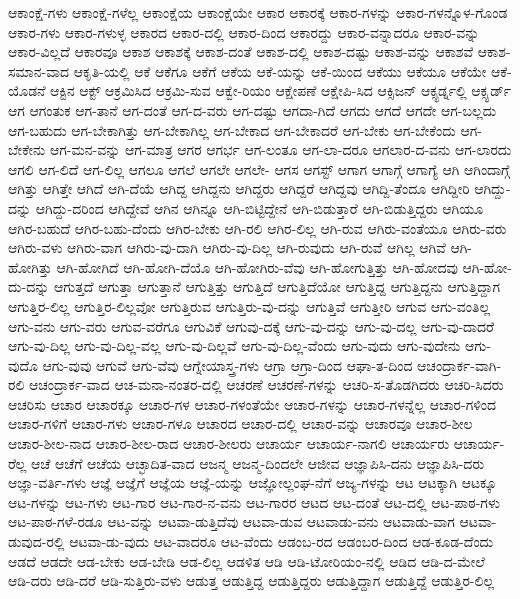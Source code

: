 {ಆಕಾಂಕ್ಷೆ-ಗಳು
ಆಕಾಂಕ್ಷೆ-ಗಳೆಲ್ಲ
ಆಕಾಂಕ್ಷೆಯ
ಆಕಾಂಕ್ಷೆಯೇ
ಆಕಾರ
ಆಕಾರಕ್ಕೆ
ಆಕಾರ-ಗಳನ್ನು
ಆಕಾರ-ಗಳನ್ನೊಳ-ಗೊಂಡ
ಆಕಾರ-ಗಳು
ಆಕಾರ-ಗಳುಳ್ಳ
ಆಕಾರದ
ಆಕಾರ-ದಲ್ಲಿ
ಆಕಾರ-ದಿಂದ
ಆಕಾರದ್ದು
ಆಕಾರ-ವನ್ನಾದರೂ
ಆಕಾರ-ವನ್ನು
ಆಕಾರ-ವಿಲ್ಲದೆ
ಆಕಾರವೂ
ಆಕಾಶ
ಆಕಾಶಕ್ಕೆ
ಆಕಾಶ-ದಂತೆ
ಆಕಾಶ-ದಲ್ಲಿ
ಆಕಾಶ-ದಷ್ಟು
ಆಕಾಶ-ವನ್ನು
ಆಕಾಶವೆ
ಆಕಾಶ-ಸಮಾನ-ವಾದ
ಆಕೃತಿ-ಯಲ್ಲಿ
ಆಕೆ
ಆಕೆಗೂ
ಆಕೆಗೆ
ಆಕೆಯ
ಆಕೆ-ಯನ್ನು
ಆಕೆ-ಯಿಂದ
ಆಕೆಯು
ಆಕೆಯೂ
ಆಕೆಯೇ
ಆಕೆ-ಯೊಡನೆ
ಆಕ್ಟಿನ
ಆಕ್ಟ್
ಆಕ್ರಮಿಸಿದ
ಆಕ್ರಮಿ-ಸುವ
ಆಕ್ವೇ-ರಿಯಂ
ಆಕ್ಷೇಪಣೆ
ಆಕ್ಷೇಪಿ-ಸಿದ
ಆಕ್ಸಿಜನ್
ಆಕ್ಸ್ಫರ್ಡ್ನಲ್ಲಿ
ಆಕ್ಸ್ಫರ್ಡ್
ಆಗ
ಆಗಂತುಕ
ಆಗ-ತಾನೆ
ಆಗ-ದಂತೆ
ಆಗ-ದ-ವರು
ಆಗ-ದಷ್ಟು
ಆಗದಾ-ಗಿದೆ
ಆಗದು
ಆಗದೆ
ಆಗದೇ
ಆಗ-ಬಲ್ಲದು
ಆಗ-ಬಹುದು
ಆಗ-ಬೇಕಾಗಿತ್ತು
ಆಗ-ಬೇಕಾಗಿಲ್ಲ
ಆಗ-ಬೇಕಾದ
ಆಗ-ಬೇಕಾದರೆ
ಆಗ-ಬೇಕು
ಆಗ-ಬೇಕೆಂದು
ಆಗ-ಬೇಕೇನು
ಆಗ-ಮನ-ವನ್ನು
ಆಗ-ಮಾತ್ರ
ಆಗರ
ಆಗರ್ಭ
ಆಗ-ಲಂತೂ
ಆಗ-ಲಾ-ದರೂ
ಆಗಲಾರ-ದ-ವನು
ಆಗ-ಲಾರದು
ಆಗಲಿ
ಆಗ-ಲಿದೆ
ಆಗ-ಲಿಲ್ಲ
ಆಗಲೂ
ಆಗಲೆ
ಆಗಲೇ
ಆಗಲೇ-
ಆಗಸ
ಆಗಸ್ಟ್
ಆಗಾಗ
ಆಗಾಗ್ಗೆ
ಆಗಾಗ್ಯೆ
ಆಗಿ
ಆಗಿಂದಾಗ್ಗೆ
ಆಗಿತ್ತು
ಆಗಿತ್ತೇ
ಆಗಿದೆ
ಆಗಿ-ದೆಯೆ
ಆಗಿದ್ದ
ಆಗಿದ್ದನು
ಆಗಿದ್ದರು
ಆಗಿದ್ದರೆ
ಆಗಿದ್ದವು
ಆಗಿದ್ದಿ-ತೆಂದೂ
ಆಗಿದ್ದೀರಿ
ಆಗಿದ್ದು-ದನ್ನು
ಆಗಿದ್ದು-ದರಿಂದ
ಆಗಿದ್ದೇವೆ
ಆಗಿನ
ಆಗಿನ್ನೂ
ಆಗಿ-ಬಿಟ್ಟಿದ್ದೇನೆ
ಆಗಿ-ಬಿಡುತ್ತಾರೆ
ಆಗಿ-ಬಿಡುತ್ತಿದ್ದರು
ಆಗಿಯೂ
ಆಗಿರ-ಬಹುದೆ
ಆಗಿರ-ಬಹು-ದೆಂದು
ಆಗಿರ-ಬೇಕು
ಆಗಿ-ರಲಿ
ಆಗಿರ-ಲಿಲ್ಲ
ಆಗಿ-ರುವ
ಆಗಿರು-ವಂತೆಯೂ
ಆಗಿರು-ವರು
ಆಗಿರು-ವಳು
ಆಗಿರು-ವಾಗ
ಆಗಿರು-ವು-ದಾಗಿ
ಆಗಿರು-ವು-ದಿಲ್ಲ
ಆಗಿ-ರುವುದು
ಆಗಿ-ರುವೆ
ಆಗಿಲ್ಲ
ಆಗಿವೆ
ಆಗಿ-ಹೋಗಿತ್ತು
ಆಗಿ-ಹೋಗಿದೆ
ಆಗಿ-ಹೋಗಿ-ದೆಯೊ
ಆಗಿ-ಹೋಗಿರು-ವೆವು
ಆಗಿ-ಹೋಗುತ್ತಿತ್ತು
ಆಗಿ-ಹೋದವು
ಆಗಿ-ಹೋ-ದು-ದನ್ನು
ಆಗುತ್ತದೆ
ಆಗುತ್ತಾ
ಆಗುತ್ತಾನೆ
ಆಗುತ್ತಿತ್ತು
ಆಗುತ್ತಿದೆ
ಆಗುತ್ತಿದೆಯೋ
ಆಗುತ್ತಿದ್ದ
ಆಗುತ್ತಿದ್ದನು
ಆಗುತ್ತಿದ್ದಾಗ
ಆಗುತ್ತಿರ-ಲಿಲ್ಲ
ಆಗುತ್ತಿರ-ಲಿಲ್ಲವೋ
ಆಗುತ್ತಿರುವ
ಆಗುತ್ತಿರು-ವು-ದನ್ನು
ಆಗುತ್ತಿವೆ
ಆಗುತ್ತೀರಿ
ಆಗುವ
ಆಗು-ವಂತಿಲ್ಲ
ಆಗು-ವನು
ಆಗು-ವರು
ಆಗುವ-ವರೆಗೂ
ಆಗುವಿಕೆ
ಆಗುವು-ದಕ್ಕೆ
ಆಗು-ವು-ದನ್ನು
ಆಗು-ವು-ದಲ್ಲ
ಆಗು-ವು-ದಾದರೆ
ಆಗು-ವು-ದಿಲ್ಲ
ಆಗು-ವು-ದಿಲ್ಲ-ವಲ್ಲ
ಆಗು-ವು-ದಿಲ್ಲವೆ
ಆಗು-ವು-ದಿಲ್ಲ-ವೆಂದು
ಆಗು-ವುದು
ಆಗು-ವುದೇನು
ಆಗು-ವುದೊ
ಆಗು-ವುವು
ಆಗುವೆ
ಆಗು-ವೆವು
ಆಗ್ನೇಯಾಸ್ತ್ರ-ಗಳು
ಆಗ್ರಾ
ಆಗ್ರಾ-ದಿಂದ
ಆಘಾ-ತ-ದಿಂದ
ಆಚಂದ್ರಾರ್ಕ-ವಾಗಿ-ರಲಿ
ಆಚಂದ್ರಾರ್ಕ-ವಾದ
ಆಚ-ಮನಾ-ನಂತರ-ದಲ್ಲಿ
ಆಚರಣೆ
ಆಚರಣೆ-ಗಳನ್ನು
ಆಚರಿ-ಸ-ತೊಡಗಿದರು
ಆಚರಿ-ಸಿದರು
ಆಚರಿಸು
ಆಚಾರ
ಆಚಾರಕ್ಕೂ
ಆಚಾರ-ಗಳ
ಆಚಾರ-ಗಳಂತೆಯೇ
ಆಚಾರ-ಗಳನ್ನು
ಆಚಾರ-ಗಳನ್ನೆಲ್ಲ
ಆಚಾರ-ಗಳಿಂದ
ಆಚಾರ-ಗಳಿಗೆ
ಆಚಾರ-ಗಳು
ಆಚಾರ-ಗಳೂ
ಆಚಾರದ
ಆಚಾರ-ದಲ್ಲಿ
ಆಚಾರ-ವನ್ನು
ಆಚಾರವೂ
ಆಚಾರ-ಶೀಲ
ಆಚಾರ-ಶೀಲ-ನಾದ
ಆಚಾರ-ಶೀಲ-ರಾದ
ಆಚಾರ-ಶೀಲರು
ಆಚಾರ್ಯ
ಆಚಾರ್ಯ-ನಾಗಲಿ
ಆಚಾರ್ಯರು
ಆಚಾರ್ಯ-ರೆಲ್ಲ
ಆಚೆ
ಆಚೆಗೆ
ಆಚೆಯ
ಆಚ್ಛಾದಿತ-ವಾದ
ಆಜನ್ಮ
ಆಜನ್ಮ-ದಿಂದಲೇ
ಆಜೀವ
ಆಜ್ಞಾಪಿಸಿ-ದನು
ಆಜ್ಞಾಪಿಸಿ-ದರು
ಆಜ್ಞಾ-ವರ್ತಿ-ಗಳು
ಆಜ್ಞೆ
ಆಜ್ಞೆಗೆ
ಆಜ್ಞೆಯ
ಆಜ್ಞೆ-ಯನ್ನು
ಆಜ್ಞೋಲ್ಲಂಘ-ನೆಗೆ
ಆಜ್ಯ-ಗಳನ್ನು
ಆಟ
ಆಟಕ್ಕಾಗಿ
ಆಟಕ್ಕೂ
ಆಟ-ಗಳನ್ನು
ಆಟ-ಗಳು
ಆಟ-ಗಾರ
ಆಟ-ಗಾರ-ನ-ವನು
ಆಟ-ಗಾರರ
ಆಟದ
ಆಟ-ದಂತೆ
ಆಟ-ದಲ್ಲಿ
ಆಟ-ಪಾಠ-ಗಳು
ಆಟ-ಪಾಠ-ಗಳೆ-ರಡೂ
ಆಟ-ವನ್ನು
ಆಟವಾ-ಡುತ್ತಿದೆವು
ಆಟವಾ-ಡುವ
ಆಟವಾಡು-ವನು
ಆಟವಾಡು-ವಾಗ
ಆಟವಾ-ಡುವುದ-ರಲ್ಲಿ
ಆಟವಾ-ಡು-ವುದು
ಆಟ-ವಾದರೂ
ಆಟ-ವೆಂದು
ಆಡಂಬ-ರದ
ಆಡಂಬರ-ದಿಂದ
ಆಡ-ಕೂಡ-ದೆಂದು
ಆಡದೆ
ಆಡದೇ
ಆಡ-ಬೇಕು
ಆಡ-ಬೇಡಿ
ಆಡ-ಲಿಲ್ಲ
ಆಡಳಿತ
ಆಡಿ
ಆಡಿ-ಟೋರಿಯಂ-ನಲ್ಲಿ
ಆಡಿದ
ಆಡಿ-ದ-ಮೇಲೆ
ಆಡಿ-ದರು
ಆಡಿ-ದರೆ
ಆಡಿ-ಸುತ್ತಿರು-ವಳು
ಆಡುತ್ತ
ಆಡುತ್ತಿದ್ದ
ಆಡುತ್ತಿದ್ದರು
ಆಡುತ್ತಿದ್ದಾಗ
ಆಡುತ್ತಿದ್ದೆ
ಆಡುತ್ತಿರ-ಲಿಲ್ಲ
}
